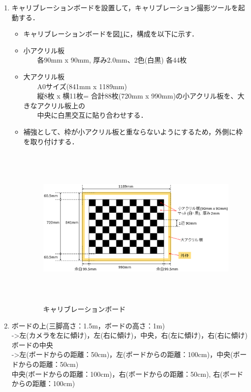 \begin{enumerate}
\item キャリブレーションボードを設置して，キャリブレーション撮影ツールを起動する．
\begin{itemize}
\item キャリブレーションボードを図{\ref{キャリブレーションボード}}に，構成を以下に示す．
\item 小アクリル板\\
　　各90mm x 90mm, 厚み2.0mm、2色(白黒) 各44枚
\item 大アクリル板\\
　　A0サイズ(841mm x 1189mm)\\
　　縦8枚 x 横11枚= 合計88枚(720mm x 990mm)の小アクリル板を、大きなアクリル板上の\\
　　中央に白黒交互に貼り合わせする．
\item 補強として、枠が小アクリル板と重ならないようにするため，外側に枠を取り付けする．
\begin{figure}[htbp]
  \begin{center}
   \includegraphics[height=80mm]{figure/キャリブレーションボード.eps}
   \caption{キャリブレーションボード}
   \label{キャリブレーションボード}
  \end{center}
\end{figure}
\end{itemize}

\vspace{15mm}
\item ボードの上(三脚高さ：1.5m，ボードの高さ：1m)\\
->左(カメラを左に傾け)，左(右に傾け)，中央，右(左に傾け)，右(右に傾け)\\

ボードの中央\\
->左(ボードからの距離：50cm)，左(ボードからの距離：100cm)，中央(ボードからの距離：50cm)\\
中央(ボードからの距離：100cm)，右(ボードからの距離：50cm), 右(ボードからの距離：100cm)\\


\end{enumerate}
